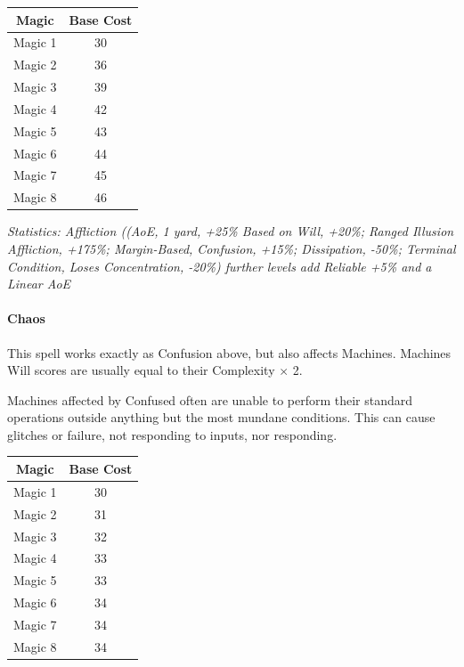 \begin{multicols*}{3}
	\begin{center}
		\begin{tabular}{|c|c|}
			\hline
			Magic & Base Cost \\
			\hline
			\hline
			Magic 1 & 30 \\
			Magic 2 & 36 \\
			Magic 3 & 39 \\
			Magic 4 & 42 \\
			Magic 5 & 43 \\
			Magic 6 & 44 \\
			Magic 7 & 45 \\
			Magic 8 & 46 \\
			\hline
		\end{tabular}
	\end{center}
	
	\textcolor{OliveGreen}{\textit{Statistics: Affliction ((AoE, 1 yard, +25\% Based on Will, +20\%; Ranged Illusion Affliction, +175\%; Margin-Based, Confusion, +15\%; Dissipation, -50\%; Terminal Condition, Loses Concentration, -20\%)  further levels add Reliable +5\% and a Linear AoE}}
	
	\paragraph{Chaos}
	
	This spell works exactly as Confusion above, but also affects Machines. Machines Will scores are usually equal to their Complexity $\times$ 2.
	
	Machines affected by Confused often are unable to perform their standard operations outside anything but the most mundane conditions. This can cause glitches or failure, not responding to inputs, nor responding.
	
	\begin{center}
		\begin{tabular}{|c|c|}
			\hline
			Magic & Base Cost \\
			\hline
			\hline
			Magic 1 & 30 \\
			Magic 2 & 31 \\
			Magic 3 & 32 \\
			Magic 4 & 33 \\
			Magic 5 & 33 \\
			Magic 6 & 34 \\
			Magic 7 & 34 \\
			Magic 8 & 34 \\
			\hline
		\end{tabular}
	\end{center}	
	

\end{multicols*}
